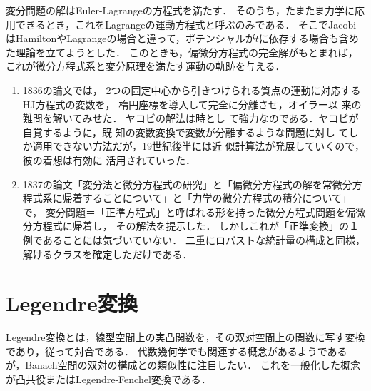 \documentclass[uplatex,dvipdfmx]{jsreport}
\begin{document}
\begin{history}
    変分問題の解はEuler-Lagrangeの方程式を満たす．
    そのうち，たまたま力学に応用できるとき，これをLagrangeの運動方程式と呼ぶのみである．
    そこでJacobiはHamiltonやLagrangeの場合と違って，ポテンシャルが$t$に依存する場合も含めた理論を立てようとした．
    このときも，偏微分方程式の完全解がもとまれば，これが微分方程式系と変分原理を満たす運動の軌跡を与える．
\end{history}

\begin{history}[偏微分方程式の解法理論への貢献]\mbox{}
    \begin{enumerate}
        \item 1836の論文\cite{Jacobi36}では，
        2つの固定中心から引きつけられる質点の運動に対応するHJ方程式の変数を，
        楕円座標を導入して完全に分離させ，オイラー以
        来の難問を解いてみせた．
        ヤコビの解法は時とし
        て強力なのである．ヤコビが自覚するように，既
        知の変数変換で変数が分離するような問題に対し
        てしか適用できない方法だが，19世紀後半には近
        似計算法が発展していくので，彼の着想は有効に
        活用されていった．
        \item 1837の論文\cite{Jacobi37}「変分法と微分方程式の研究」と「偏微分方程式の解を常微分方程式系に帰着することについて」と「力学の微分方程式の積分について」で，
        変分問題＝「正準方程式」と呼ばれる形を持った微分方程式問題を偏微分方程式に帰着し，
        その解法を提示した．
        しかしこれが「正準変換」の１例であることには気づいていない．
        二重にロバストな統計量の構成と同様，解けるクラスを確定しただけである．
    \end{enumerate}
\end{history}

\section{Legendre変換}

\begin{tcolorbox}[colframe=ForestGreen, colback=ForestGreen!10!white,breakable,colbacktitle=ForestGreen!40!white,coltitle=black,fonttitle=\bfseries\sffamily,
title=]
    Legendre変換とは，線型空間上の実凸関数を，その双対空間上の関数に写す変換であり，従って対合である．
    代数幾何学でも関連する概念があるようであるが，Banach空間の双対の構成との類似性に注目したい．
    これを一般化した概念が凸共役またはLegendre-Fenchel変換である．
\end{tcolorbox}
\end{document}
